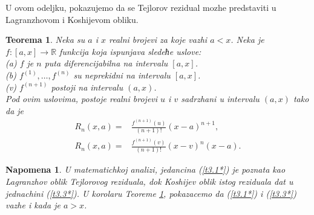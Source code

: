 \documentclass[12pt,a4paper]{article}
\newtheorem{thm}{Teorema}%
\newtheorem*{nap}{Napomena}
\begin{document}
 U ovom odeljku, 
 pokazujemo da se Tejlorov rezidual mozhe predstaviti u 
 Lagranzhovom i Koshijevom obliku. 
 
 \begin{thm}\label{thm3}
 Neka su $a$ i $x$ realni brojevi za koje vazhi $a<x$. 
 Neka je $f:[a,x]\rightarrow\mathbb{R}$ funkcija 
 koja ispunjava sledeћe uslove: 
 \\
 (a) $f$ je $n$ puta diferencijabilna na intervalu 
 $[a,x]$. 
 \\
(b) $f^{(1)},\dots,f^{(n)}$ su neprekidni na intervalu 
 $[a,x]$. 
 \\
 (v) $f^{(n+1)}$ postoji na intervalu $(a,x)$.
 \\
 Pod ovim uslovima, postoje realni brojevi $u$ i $v$
 sadrzhani u intervalu $(a,x)$ tako da je 
 \begin{align}
    \label{t3.1*}
     R_{n}(x,a)
     =&
     \frac{f^{(n+1)}(u)}{(n+1)!}(x-a)^{n+1}, 
     \\
     \label{t3.3*}
     R_{n}(x,a)
     =&
     \frac{f^{(n+1)}(v)}{(n+1)!}(x-v)^{n}(x-a). 
 \end{align}
 \end{thm}
 
 \begin{nap}
 U matematichkoj analizi, jedancina (\ref{t3.1*}) je poznata 
 kao Lagranzhov oblik Tejlorovog reziduala, 
 dok Koshijev oblik istog reziduala dat u jednachini (\ref{t3.3*}). 
 U korolaru Teoreme \ref{thm3}, pokazacemo 
 da (\ref{t3.1*}) i (\ref{t3.3*}) vazhe i kada je $a>x$. 
 \end{nap}
 
\end{document}

